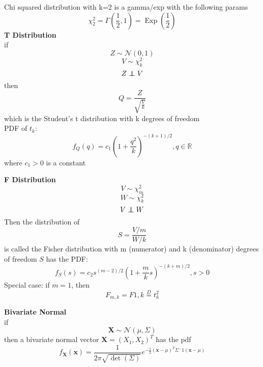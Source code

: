 \documentclass[twocolumn]{amsart}
\newcommand{\Exp}{\operatorname{Exp}}
\newcommand\independent{\protect\mathpalette{\protect\independenT}{\perp}}
\def\independenT#1#2{\mathrel{\rlap{$#1#2$}\mkern3mu{#1#2}}}
\begin{document}
Chi squared distribution with k=2 is a gamma/exp with the following params
\begin{equation*}
  \chi_{2}^{2} = \Gamma(\frac{1}{2},1) = \Exp(\frac{1}{2})
\end{equation*}
\textbf{T Distribution} \\
if
\begin{equation*}
  Z \sim \mathcal{N}(0, 1)
\end{equation*}
\begin{equation*}
  V \sim \chi_{k}^{2}
\end{equation*}
\begin{equation*}
  Z \independent V
\end{equation*}
then
\begin{equation*}
  Q = \frac{Z}{\sqrt{\frac{V}{k}}}
\end{equation*}
which is the Student's t distribution with k degrees of freedom \\
PDF of \(t_{k}\):
\begin{equation*}
  f_{Q}(q) = c_{1}{(1+\frac{q^{2}}{k})}^{-(k+1)/2}, q \in \mathbb{R}
\end{equation*}
where \(c_{1}>0\) is a constant

\textbf{F Distribution} \\
\begin{equation*}
  V \sim \chi^{2}_{m}
\end{equation*}
\begin{equation*}
  W \sim \chi^{2}_{k}
\end{equation*}
\begin{equation*}
  V \independent W
\end{equation*}
Then the distribution of
\begin{equation*}
  S = \frac{V/m}{W/k}
\end{equation*}
is called the Fisher distribution with m (numerator) and k (denominator) degrees of freedom
\(S\) has the PDF:
\begin{equation*}
  f_{S}(s) = c_{2}s^{(m-2)/2}(1+\frac{m}{k}s)^{-(k+m)/2},s>0
\end{equation*}
Special case:
if \(m=1\), then
\begin{equation*}
  F_{m,k}=F{1,k} \stackrel{D}{=} t^{2}_{k}
\end{equation*}


\textbf{Bivariate Normal} \\
if
\begin{equation*}
  \textbf{X} \sim \mathcal{N}(\mu, \Sigma)
\end{equation*}
then a bivariate normal vector \(\textbf{X} = (X_{1},X_{2})^T\) has the pdf
\begin{equation*}
  f_{\textbf{X}}(\textbf{x}) = \frac{1}{2\pi\sqrt{\det(\Sigma)}}e^{-\frac{1}{2}{(\textbf{x}-\mu)}^{T}\Sigma^-1(\textbf{x}-\mu)}
\end{equation*}
\end{document}
